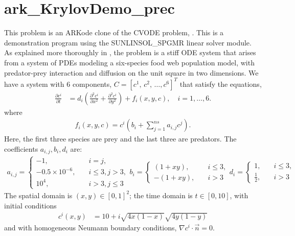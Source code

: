\documentclass[letterpaper,10pt,english]{sphinxmanual}
\begin{document}
\section{ark\_KrylovDemo\_prec}
\label{\detokenize{c_serial:ark-krylovdemo-prec}}\label{\detokenize{c_serial:id30}}
This problem is an ARKode clone of the CVODE problem,
.  This is a demonstration program using the
SUNLINSOL\_SPGMR linear solver module.  As explained more thoroughly in
\label{\detokenize{c_serial:id31}}{\hyperref[\detokenize{References:hsr2017}]{\sphinxcrossref{{[}HSR2017{]}}}}, the problem is a stiff ODE system that arises from a
system of PDEs modeling a six-species food web population model, with
predator-prey interaction and diffusion on the unit square in two
dimensions.  We have a system with 6 components, \(C = [c^1,\,
c^2,\,\ldots, c^6]^T\) that satisfy the equations,
\begin{equation*}
\begin{split}\frac{\partial c^i}{\partial t} &= d_i \left(\frac{\partial^2 c^i}{\partial
   x^2} + \frac{\partial^2 c^i}{\partial y^2}\right) +
   f_i(x,y,c),\quad i=1,\ldots,6.\end{split}
\end{equation*}
where
\begin{equation*}
\begin{split}f_i(x,y,c) = c^i\left( b_i + \sum_{j=1}^{ns} a_{i,j} c^j\right).\end{split}
\end{equation*}
Here, the first three species are prey and the last three are
predators.  The coefficients \(a_{i,j}, b_i, d_i\) are:
\begin{equation*}
\begin{split}a_{i,j} = \begin{cases}
            -1, \quad & i=j,\\
            -0.5\times10^{-6}, \quad & i\le 3, j>3, \\
             10^4, \quad & i>3, j\le3
          \end{cases}
b_i = \begin{cases}
         (1+xy), \quad & i\le 3,\\
        -(1+xy), \quad & i>3
      \end{cases}
d_i = \begin{cases}
         1, \quad & i\le 3,\\
         \frac12, \quad & i>3
      \end{cases}\end{split}
\end{equation*}
The spatial domain is \((x,y) \in [0, 1]^2\); the time domain is
\(t \in [0,10]\), with initial conditions
\begin{equation*}
\begin{split}c^i(x,y) &=  10 + i \sqrt{4x(1-x)}\sqrt{4y(1-y)}\end{split}
\end{equation*}
and with homogeneous Neumann boundary conditions,
\(\nabla c^i \cdot \vec{n} = 0\).
\end{document}
